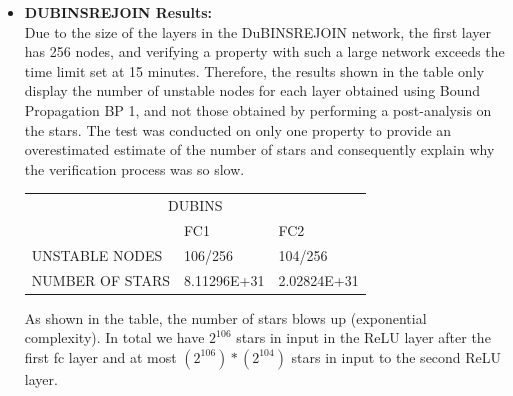 \begin{itemize}
    \item \textbf{DUBINSREJOIN Results:} \\
    Due to the size of the layers in the DuBINSREJOIN network, the first layer has 256 nodes, and verifying a property with such a large network exceeds the time limit set at 15 minutes. 
    Therefore, the results shown in the table only display the number of unstable nodes for each layer obtained using Bound Propagation BP 1, and not those obtained by performing a post-analysis on the stars. 
    The test was conducted on only one property to provide an overestimated estimate of the number of stars and consequently explain why the verification process was so slow.

    \begin{table}[H]        
        \centering
        \begin{tabular}{lll}
        \toprule
        \multicolumn{3}{c}{DUBINS}  \\
        \cmidrule(r){1-3}
                        & FC1                                & FC2                                \\
        UNSTABLE NODES  & {\color[HTML]{B4C6E7} 106/256}     & {\color[HTML]{B4C6E7} 104/256}     \\
        NUMBER OF STARS & {\color[HTML]{C00000} 8.11296E+31} & {\color[HTML]{C00000} 2.02824E+31}
        \end{tabular}
    \end{table}

    As shown in the table, the number of stars blows up (exponential complexity). In total we have $2^106$ stars in input in the ReLU layer after the first fc layer and  at most $(2^106)*(2^104)$ stars in input to the second ReLU layer.

\end{itemize}

